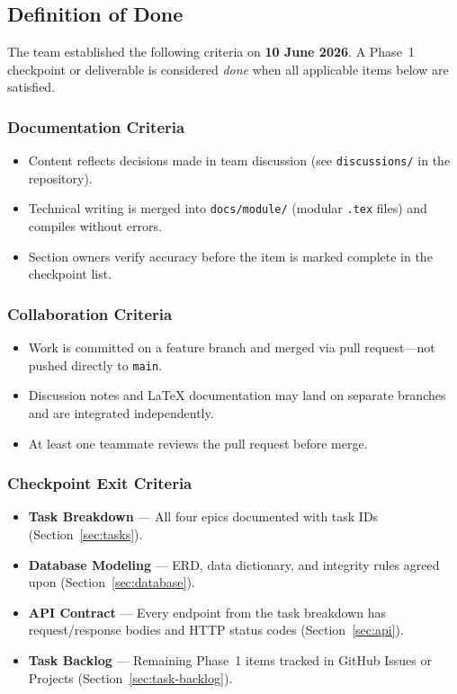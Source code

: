 \subsection{Definition of Done}\label{sec:dod}
The team established the following criteria on \textbf{10 June 2026}. A Phase~1 checkpoint or
deliverable is considered \emph{done} when all applicable items below are satisfied.

\subsubsection{Documentation Criteria}
\begin{itemize}
  \item Content reflects decisions made in team discussion (see \texttt{discussions/} in the repository).
  \item Technical writing is merged into \texttt{docs/module/} (modular \texttt{.tex} files) and compiles without errors.
  \item Section owners verify accuracy before the item is marked complete in the checkpoint list.
\end{itemize}

\subsubsection{Collaboration Criteria}
\begin{itemize}
  \item Work is committed on a feature branch and merged via pull request---not pushed directly to \texttt{main}.
  \item Discussion notes and LaTeX documentation may land on separate branches and are integrated independently.
  \item At least one teammate reviews the pull request before merge.
\end{itemize}

\subsubsection{Checkpoint Exit Criteria}
\begin{itemize}
  \item \textbf{Task Breakdown} --- All four epics documented with task IDs (Section~\ref{sec:tasks}).
  \item \textbf{Database Modeling} --- ERD, data dictionary, and integrity rules agreed upon (Section~\ref{sec:database}).
  \item \textbf{API Contract} --- Every endpoint from the task breakdown has request/response bodies and HTTP status codes (Section~\ref{sec:api}).
  \item \textbf{Task Backlog} --- Remaining Phase~1 items tracked in GitHub Issues or Projects (Section~\ref{sec:task-backlog}).
\end{itemize}

